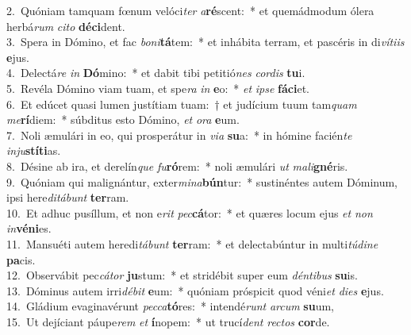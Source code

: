 {2.~}Quóniam tamquam fœnum velóci\textit{ter} \textit{a}\textbf{ré}scent:~* et quemádmodum ólera herbá\textit{rum} \textit{ci}\textit{to} \textbf{dé}\textbf{ci}dent.\\
{3.~}Spera in Dómino, et fac \textit{bo}\textit{ni}\textbf{tá}tem:~* et inhábita terram, et pascéris in di\textit{ví}\textit{ti}\textit{is} \textbf{e}jus.\\
{4.~}Delectá\textit{re} \textit{in} \textbf{Dó}mino:~* et dabit tibi petitió\textit{nes} \textit{cor}\textit{dis} \textbf{tu}i.\\
{5.~}Revéla Dómino viam tuam, et spe\textit{ra} \textit{in} \textbf{e}o:~* \textit{et} \textit{i}\textit{pse} \textbf{fá}\textbf{ci}et.\\
{6.~}Et edúcet quasi lumen justítiam tuam:~† et judícium tuum tam\textit{quam} \textit{me}\textbf{rí}diem:~* súbditus esto Dómino, \textit{et} \textit{o}\textit{ra} \textbf{e}um.\\
{7.~}Noli æmulári in eo, qui prosperátur in \textit{vi}\textit{a} \textbf{su}a:~* in hómine facién\textit{te} \textit{in}\textit{ju}\textbf{stí}\textbf{ti}as.\\
{8.~}Désine ab ira, et derelín\textit{que} \textit{fu}\textbf{ró}rem:~* noli æmulári \textit{ut} \textit{ma}\textit{li}\textbf{gné}ris.\\
{9.~}Quóniam qui malignántur, exter\textit{mi}\textit{na}\textbf{bún}tur:~* sustinéntes autem Dóminum, ipsi here\textit{di}\textit{tá}\textit{bunt} \textbf{ter}ram.\\
{10.~}Et adhuc pusíllum, et non e\textit{rit} \textit{pec}\textbf{cá}tor:~* et quæres locum ejus \textit{et} \textit{non} \textit{in}\textbf{vé}\textbf{ni}es.\\
{11.~}Mansuéti autem heredi\textit{tá}\textit{bunt} \textbf{ter}ram:~* et delectabúntur in multi\textit{tú}\textit{di}\textit{ne} \textbf{pa}cis.\\
{12.~}Observábit pec\textit{cá}\textit{tor} \textbf{ju}stum:~* et stridébit super eum \textit{dén}\textit{ti}\textit{bus} \textbf{su}is.\\
{13.~}Dóminus autem irri\textit{dé}\textit{bit} \textbf{e}um:~* quóniam próspicit quod véni\textit{et} \textit{di}\textit{es} \textbf{e}jus.\\
{14.~}Gládium evaginavérunt \textit{pec}\textit{ca}\textbf{tó}res:~* intendé\textit{runt} \textit{ar}\textit{cum} \textbf{su}um,\\
{15.~}Ut dejíciant páupe\textit{rem} \textit{et} \textbf{í}nopem:~* ut trucí\textit{dent} \textit{re}\textit{ctos} \textbf{cor}de.\\
